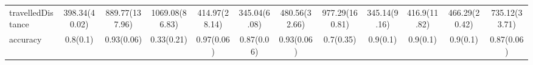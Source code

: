 \documentclass{article}
\begin{document}
\begin{table}
{\begin{tabular}{l|ccccccccccc}
    travelledDistance & 398.34(40.02) & 889.77(137.96) & 1069.08(86.83) & 414.97(28.14) & 345.04(6.08) & 480.56(32.66) & 977.29(160.81) & 345.14(9.16) & 416.9(11.82) & 466.29(20.42) & 735.12(33.71) \\
    accuracy & 0.8(0.1) & 0.93(0.06) & 0.33(0.21) & 0.97(0.06) & 0.87(0.06) & 0.93(0.06) & 0.7(0.35) & 0.9(0.1) & 0.9(0.1) & 0.9(0.1) & 0.87(0.06) \\ \hline
    \end{tabular}}
\end{table}
\end{document}
